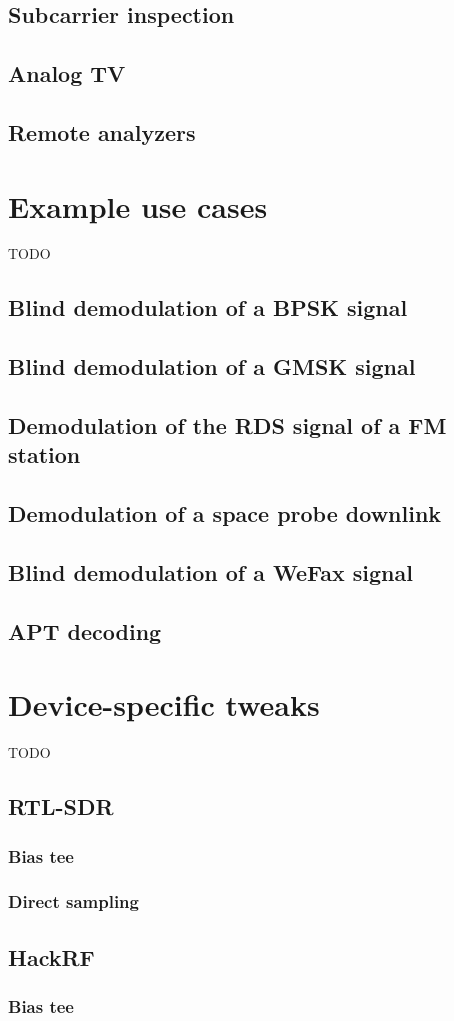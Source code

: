 \documentclass{ol-softwaremanual}
\begin{document}
\section{Subcarrier inspection}
\section{Analog TV}
\section{Remote analyzers}

\appendix

\chapter{Example use cases}
TODO
\section{Blind demodulation of a BPSK signal}
\section{Blind demodulation of a GMSK signal}
\section{Demodulation of the RDS signal of a FM station}
\section{Demodulation of a space probe downlink}
\section{Blind demodulation of a WeFax signal}
\section{APT decoding}

\chapter{Device-specific tweaks}
TODO
\section{RTL-SDR}
\subsection{Bias tee}
\subsection{Direct sampling}
\section{HackRF}
\subsection{Bias tee}
\end{document}
